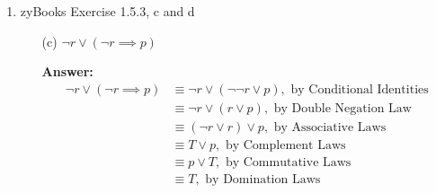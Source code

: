 \documentclass[12pt]{extreport}
\newcommand{\answer}[0]{\medskip \textbf{Answer:} \medskip}
\begin{document}
\begin{enumerate}
\begin{enumerate}
            \item[(i)] \( (p \land q) \implies r \equiv (p \land \neg r) \implies \neg q \)
            
                \answer
                \begin{align*}
                    (p \land \neg r) \implies \neg q &\equiv \neg (p \land \neg r) \lor \neg q, \text{ by Conditional Identities} \\
                                                     &\equiv (\neg p \lor r) \lor \neg q, \text{ by De Morgan's Laws} \\
                                                     &\equiv (\neg p \lor \neg q) \lor r, \text{ by Commutative Laws} \\
                                                     &\equiv \neg (p \land q) \lor r, \text{ by De Morgan's Laws} \\
                                                     &\equiv (p \land q) \implies r, \text{ by Conditional Identities}
                \end{align*}

        \end{enumerate}

    \item zyBooks Exercise 1.5.3, c and d
    
        \begin{enumerate}
            
            \item[(c)] \( \neg r \lor (\neg r \implies p) \)
            
                \answer
                \begin{align*}
                    \neg r \lor (\neg r \implies p) &\equiv \neg r \lor (\neg \neg r \lor p), \text{ by Conditional Identities} \\
                                                    &\equiv \neg r \lor (r \lor p), \text{ by Double Negation Law} \\
                                                    &\equiv (\neg r \lor r) \lor p, \text{ by Associative Laws} \\
                                                    &\equiv T \lor p, \text{ by Complement Laws} \\
                                                    &\equiv p \lor T, \text{ by Commutative Laws} \\
                                                    &\equiv T, \text{ by Domination Laws}
                \end{align*}


\end{enumerate}
\end{enumerate}
\end{document}
